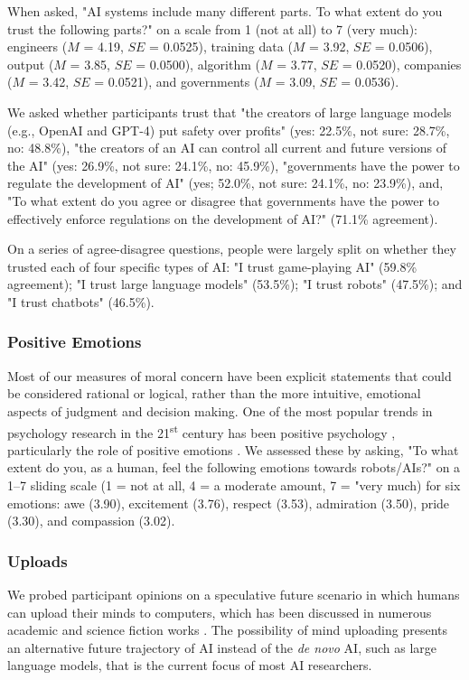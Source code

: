 \documentclass[manuscript,screen,review,nonacm]{acmart}
\begin{document}
When asked, "AI systems include many different parts. To what extent do you trust the following parts?" on a scale from 1 (not at all) to 7 (very much): engineers ($M$ = 4.19, $SE$ = 0.0525), training data ($M$ = 3.92, $SE$ = 0.0506), output ($M$ = 3.85, $SE$ = 0.0500), algorithm ($M$ = 3.77, $SE$ = 0.0520), companies ($M$ = 3.42, $SE$ = 0.0521), and governments ($M$ = 3.09, $SE$ = 0.0536).

We asked whether participants trust that "the creators of large language models (e.g., OpenAI and GPT-4) put safety over profits" (yes: 22.5\%, not sure: 28.7\%, no: 48.8\%), "the creators of an AI can control all current and future versions of the AI" (yes: 26.9\%, not sure: 24.1\%, no: 45.9\%), "governments have the power to regulate the development of AI" (yes; 52.0\%, not sure: 24.1\%, no: 23.9\%), and, "To what extent do you agree or disagree that governments have the power to effectively enforce regulations on the development of AI?" (71.1\% agreement).

On a series of agree-disagree questions, people were largely split on whether they trusted each of four specific types of AI: "I trust game-playing AI" (59.8\% agreement); "I trust large language models" (53.5\%); "I trust robots" (47.5\%); and "I trust chatbots" (46.5\%).

\subsubsection{Positive Emotions}

Most of our measures of moral concern have been explicit statements that could be considered rational or logical, rather than the more intuitive, emotional aspects of judgment and decision making. One of the most popular trends in psychology research in the 21\textsuperscript{st} century has been positive psychology \cite{seligman00}, particularly the role of positive emotions \cite{fredrickson01}. We assessed these by asking, "To what extent do you, as a human, feel the following emotions towards robots/AIs?" on a 1–7 sliding scale (1 = not at all, 4 = a moderate amount, 7 = "very much) for six emotions: awe (3.90), excitement (3.76), respect (3.53), admiration (3.50), pride (3.30), and compassion (3.02).

\subsubsection{Uploads}

We probed participant opinions on a speculative future scenario in which humans can upload their minds to computers, which has been discussed in numerous academic and science fiction works \cite[for a review, see Sandberg and Bostrom][]{sandberg08a}. The possibility of mind uploading presents an alternative future trajectory of AI instead of the \textit{de novo} AI, such as large language models, that is the current focus of most AI researchers.
\end{document}
